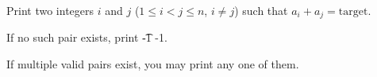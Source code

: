 Print two integers $i$ and $j$ ($1 \leq i < j \leq n$, $i \neq j$) such that $a_i + a_j = \text{target}$.

If no such pair exists, print \t{-1 -1}.

If multiple valid pairs exist, you may print any one of them.
